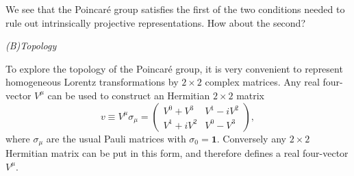 We see that the Poincar\'e group satisfies the first of the two
conditions needed to rule out intrinsically projective representations. How
about the second?

\begin{center}
\emph{(B)\quad Topology}
\end{center}

To explore the topology of the Poincar\'e group, it is very
convenient to represent homogeneous Lorentz transformations by $2\times2$
complex matrices. Any real four-vector $V^\mu$ can be used to construct an
Hermitian $2\times2$ matrix
\begin{equation}
  v\equiv V^\mu\sigma_\mu
    =\begin{pmatrix}
      V^0+V^3 & V^1-iV^2\\
      V^1+iV^2 & V^0-V^3
    \end{pmatrix},
  \tag{2.7.36}\label{eq:2.7.36}
\end{equation}
where $\sigma_\mu$ are the usual Pauli matrices with
$\sigma_0=\mathbf{1}$. Conversely any $2\times2$ Hermitian matrix can be put in
this form, and therefore defines a real four-vector $V^\mu$.

